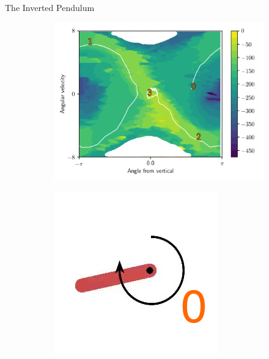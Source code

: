 \documentclass{beamer}
\begin{document}
\begin{frame}{The Inverted Pendulum}
  \begin{figure}
    \centering
    \begin{subfigure}{0.8\linewidth}
      \centering
      \includegraphics[width=\linewidth,trim=0 10 0 0,clip]{assets/pendulum_value}
      \vspace{-1em}
    \end{subfigure}
    \begin{subfigure}{0.2\linewidth}
      \centering
      \includegraphics[width=\linewidth,trim=0 0 0 20]{assets/pendulum_traj_0}

\end{subfigure}
\end{figure}
\end{frame}
\end{document}
